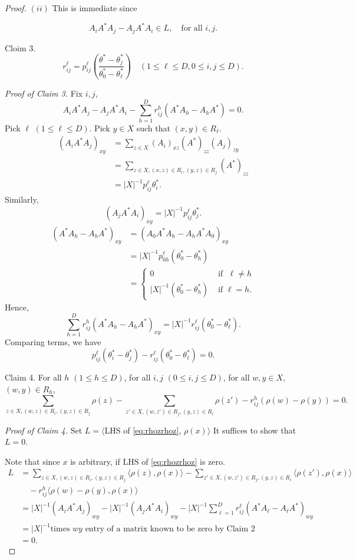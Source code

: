 \documentclass[
]{book}
\theoremstyle{definition}
\theoremstyle{definition}
\theoremstyle{definition}
\theoremstyle{definition}
\theoremstyle{remark}
\begin{document}
\begin{proof}
\((ii)\) This is immediate since

\[A_iA^*A_j - A_jA^*A_i\in L, \quad \text{for all $i,j$}.\]

Cloim 3.
\[r^\ell_{ij} = p^\ell_{ij}\left(\frac{\theta^*-\theta^*_j}{\theta^*_0 - \theta^*_\ell}\right)\quad (1\leq \ell\leq D, 0\leq i,j\leq D).\]

\emph{Proof of Claim 3.}
Fix \(i,j\),
\[A_iA^*A_j - A_jA^*A_i - \sum_{h=1}^D r^h_{ij}(A^*A_h - A_hA^*) = 0.\]
Pick \(\ell\) \((1\leq \ell \leq D)\). Pick \(y\in X\) such that \((x,y)\in R_\ell\).
\begin{align}
(A_iA^*A_j)_{xy} & = \sum_{z\in X}(A_i)_{xz}(A^*)_{zz}(A_j)_{zy}\\
& = \sum_{z\in X, (x,z)\in R_i, (y,z)\in R_j}(A^*)_{zz}\\
& = |X|^{-1}p^\ell_{ij}\theta^*_i.
\end{align}
Similarly,
\[(A_jA^*A_i)_{xy} = |X|^{-1}p^\ell_{ij}\theta^*_j.\]
\begin{align}
(A^*A_h-A_hA^*)_{xy} & = (A_0A^*A_h - A_hA^*A_0)_{xy}\\
& = |X|^{-1}p^\ell_{0h}(\theta^*_0 - \theta^*_h)\\
& = \begin{cases}
0 & \text{ if }\; \ell \neq h\\
|X|^{-1}(\theta^*_0-\theta^*_h) & \text{ if } \ell = h.
\end{cases}
\end{align}
Hence,
\[\sum_{h=1}^D r^h_{ij}(A^*A_h - A_hA^*)_{xy} = |X|^{-1}r^\ell_{ij}(\theta^*_0-\theta^*_\ell).\]
Comparing terms, we have
\[p^\ell_{ij}(\theta^*_i-\theta^*_j) - r^\ell_{ij}(\theta^*_0-\theta^*_\ell) = 0.\]

Claim 4. For all \(h\) \((1\leq h\leq D)\), for all \(i,j\) \((0\leq i,j\leq D)\), for all \(w,y\in X\), \((w,y)\in R_h\),
\begin{equation}
\sum_{z\in X,(w,z)\in R_i, (y,z)\in R_j}\rho(z)-\sum_{z'\in X, (w,z')\in R_j, (y,z)\in R_i}\rho(z') - r^h_{ij}(\rho(w)-\rho(y))=0. \label{eq:rhozrhoz}
\end{equation}

\emph{Proof of Claim 4.}
Set \(L = \langle \mathrm{LHS}\) of \eqref{eq:rhozrhoz}, \(\rho(x)\rangle\)
It suffices to show that \(L = 0\).

Note that since \(x\) is arbitrary, if \(\mathrm{LHS}\) of \eqref{eq:rhozrhoz} is zero.
\begin{align}
L & = \sum_{z\in X,(w,z)\in R_i, (y,z)\in R_j}\langle \rho(z), \rho(x)\rangle -\sum_{z'\in X, (w,z')\in R_j, (y,z)\in R_i}\langle\rho(z'),\rho(x)\rangle \\
& \quad - r^h_{ij}\langle \rho(w)-\rho(y), \rho(x)\rangle\\
& = |X|^{-1}(A_iA^*A_j)_{wy} - |X|^{-1}(A_jA^*A_i)_{wy}-|X|^{-1}\sum_{\ell=1}^Dr^\ell_{ij}(A^*A_\ell - A_\ell A^*)_{wy}\\
& = |X|^{-1} \text{times $wy$ entry of a matrix known to be zero by Claim 2}\\
& = 0.
\end{align}

\end{proof}
\end{document}
